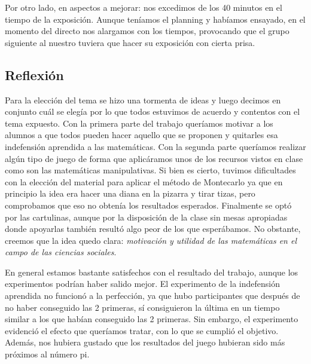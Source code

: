 Por otro lado, en aspectos a mejorar: nos excedimos de los 40 minutos en el tiempo de la exposición. 
%
Aunque teníamos el planning y habíamos ensayado, en el momento del directo nos alargamos con los tiempos, provocando que el grupo siguiente al nuestro tuviera que hacer su exposición con cierta prisa.

\subsection{Reflexión}

Para la elección del tema se hizo una tormenta de ideas y luego decimos en conjunto cuál se elegía por lo que todos estuvimos de acuerdo y contentos con el tema expuesto.
%
Con la primera parte del trabajo queríamos motivar a los alumnos a que todos pueden hacer aquello que se proponen y quitarles esa indefensión aprendida a las matemáticas.
%
Con la segunda parte queríamos realizar algún tipo de juego de forma que aplicáramos unos de los recursos vistos en clase como son las matemáticas manipulativas.
%
Si bien es cierto, tuvimos dificultades con la elección del material para aplicar el método de Montecarlo ya que en principio la idea era hacer una diana en la pizarra y tirar tizas, pero comprobamos que eso no obtenía los resultados esperados.
%
Finalmente se optó por las cartulinas, aunque por la disposición de la clase sin mesas apropiadas donde apoyarlas también resultó algo peor de los que esperábamos.
%
No obstante, creemos que la idea quedo clara: \textit{motivación y utilidad de las matemáticas en el campo de las ciencias sociales}.

En general estamos bastante satisfechos con el resultado del trabajo, aunque los experimentos podrían haber salido mejor. 
%
El experimento de la indefensión aprendida no funcionó a la perfección, ya que hubo participantes que después de no haber conseguido las 2 primeras, sí consiguieron la última en un tiempo similar a los que habían conseguido las 2 primeras.
%
Sin embargo, el experimento evidenció el efecto que queríamos tratar, con lo que se cumplió el objetivo.
%
Además, nos hubiera gustado que los resultados del juego hubieran sido más próximos al número pi.




